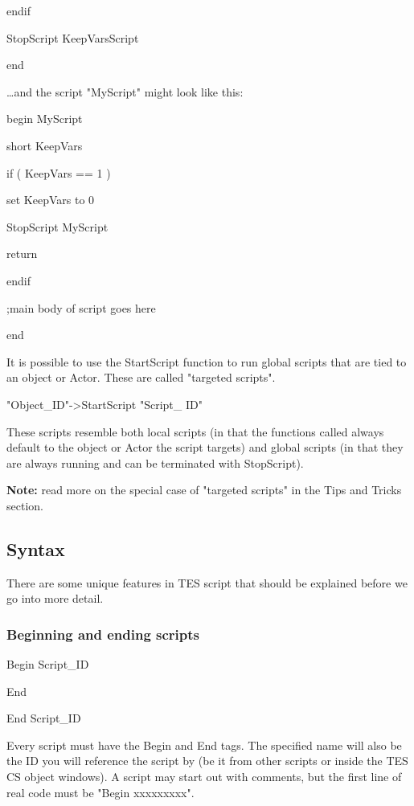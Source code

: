 \documentclass[
]{article}
\begin{document}
endif

StopScript KeepVarsScript

end

\ldots and the script "MyScript" might look like this:

begin MyScript

short KeepVars

if ( KeepVars == 1 )

set KeepVars to 0

StopScript MyScript

return

endif

;main body of script goes here

end

It is possible to use the StartScript function to run global scripts
that are tied to an object or Actor. These are called "targeted
scripts".

"Object\_ID"-\textgreater StartScript "Script\_ ID"

These scripts resemble both local scripts (in that the functions called
always default to the object or Actor the script targets) and global
scripts (in that they are always running and can be terminated with
StopScript).

\textbf{Note:} read more on the special case of "targeted scripts" in
the Tips and Tricks section.

\hypertarget{syntax}{%
\subsection{\texorpdfstring{\hfill\break
Syntax}{ Syntax}}\label{syntax}}

There are some unique features in TES script that should be explained
before we go into more detail.

\hypertarget{beginning-and-ending-scripts}{%
\subsubsection{Beginning and ending
scripts}\label{beginning-and-ending-scripts}}

Begin Script\_ID

End

End Script\_ID

Every script must have the Begin and End tags. The specified name will
also be the ID you will reference the script by (be it from other
scripts or inside the TES CS object windows). A script may start out
with comments, but the first line of real code must be "Begin
xxxxxxxxx".
\end{document}
